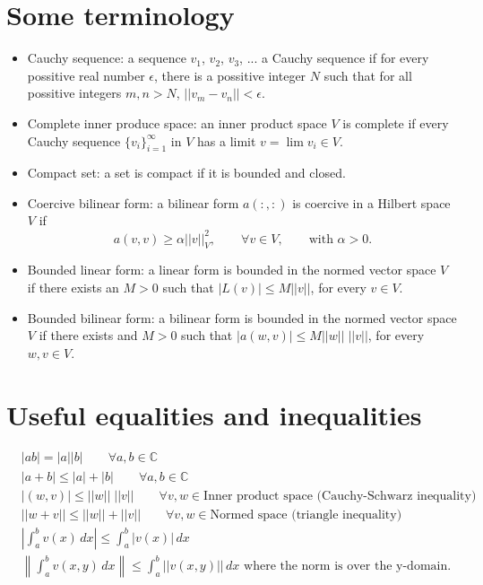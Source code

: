 \documentclass[oneside,a4paper,11pt]{report}
\begin{document}
\section{Some terminology}
\begin{itemize}
    \item Cauchy sequence: a sequence $v_1$, $v_2$, $v_3$, ... \@is a Cauchy sequence if for every possitive real number $\epsilon$, there is a possitive integer $N$ such that for all possitive integers $m,n>N$, $||v_m-v_n||<\epsilon$. 
    \item Complete inner produce space: an inner product space $V$ is complete if every Cauchy sequence $\{v_i\}_{i=1}^\infty$ in $V$ has a limit $v = \lim v_i \in V$.
    \item Compact set: a set is compact if it is bounded and closed.
    \item Coercive bilinear form: a bilinear form $a(:,:)$ is coercive in a Hilbert space $V$ if 
    \begin{equation}
        a(v,v) \ge \alpha ||v||_V^2, \qquad \forall v \in V, \qquad \text{with }\alpha > 0.
    \end{equation}
    \item Bounded linear form: a linear form is bounded in the normed vector space $V$ if there exists an $M>0$ such that $|L(v)| \le M ||v||$, for every $v \in V$. 
    \item Bounded bilinear form: a bilinear form is bounded in the normed vector space $V$ if there exists and $M>0$ such that $|a(w,v)| \le M ||w||\;||v||$, for every $w,v \in V$.
\end{itemize}

\section{Useful equalities and inequalities}
\begin{align}
    &|ab| = |a||b| \qquad \forall a,b \in \mathbb{C} \\
    &|a + b| \le |a| + |b| \qquad \forall a,b \in \mathbb{C} \\
    &|(w,v)| \le ||w||\;||v|| \qquad \forall v,w \in \text{Inner product space (Cauchy-Schwarz inequality)} \\
    &||w + v|| \le ||w|| + ||v|| \qquad \forall v,w \in \text{Normed space (triangle inequality)} \\
    &\left | \int_a^b v(x) \, dx \right| \le \int_a^b |v(x)| \, dx \\
    &\left \| \int_a^b v(x,y) \, dx \right \| \le \int_a^b ||v(x,y)|| \, dx \text{ where the norm is over the y-domain}.
\end{align}
\end{document}
